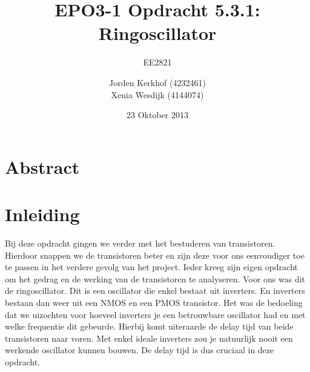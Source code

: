 \documentclass{scrartcl}  %
\author{Jorden {Kerkhof} (4232461)  \\{Xenia Wesdijk} (4144074)}
\title{EPO3-1   Opdracht 5.3.1: Ringoscillator}
\subtitle{EE2821}
\date{23 Oktober 2013}
\begin{document}
\maketitle
\vspace{80 mm}
\section*{Abstract}

\newpage
\setlength{\cftbeforetoctitleskip}{-3em}
\tableofcontents
\newpage
{}
\section{Inleiding}
Bij deze opdracht gingen we verder met het bestuderen van transistoren. Hierdoor snappen we de transistoren beter en zijn deze voor ons eenvoudiger toe te passen in het verdere gevolg van het project. Ieder kreeg zijn eigen opdracht om het gedrag en de werking van de transistoren te analyseren. Voor ons was dit de ringoscillator. Dit is een oscillator die enkel bestaat uit inverters. En inverters bestaan dan weer uit een NMOS en een PMOS transistor. Het was de bedoeling dat we uizochten voor hoeveel inverters je een betrouwbare oscillator had en met welke frequentie dit gebeurde. Hierbij komt uiteraarde de delay tijd van beide transistoren naar voren. Met enkel ideale inverters zou je natuurlijk nooit een werkende oscillator kunnen bouwen. De delay tijd is dus cruciaal in deze opdracht.  
\end{document}
